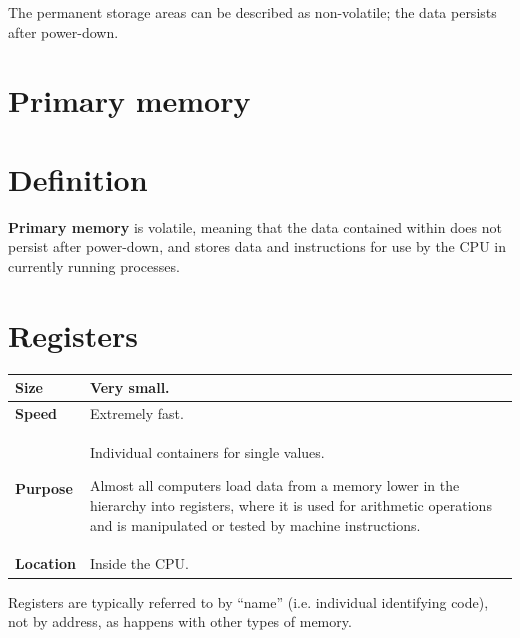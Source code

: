 \documentclass[a4paper]{systems-software}
\begin{document}
The permanent storage areas can be described as non-volatile; the data persists after power-down.


\newpage

\section{Primary memory}

\section*{Definition}

\textbf{Primary memory} is volatile, meaning that the data contained within does not persist after power-down, and stores data and instructions for use by the CPU in currently running processes.


\section*{Registers}

\begin{longtabu} to \textwidth {| X[1,l] | X[6,l] |}
    \hline
    \textbf{Size} & Very small.
	\\ \hline
	\textbf{Speed} & Extremely fast.
	\\ \hline
	\textbf{Purpose} & Individual containers for single values.
	
	Almost all computers load data from a memory lower in the hierarchy into registers, where it is used for arithmetic operations and is manipulated or tested by machine instructions.
	\\ \hline
	\textbf{Location} & Inside the CPU.
	\\ \hline
\end{longtabu}

Registers are typically referred to by “name” (i.e. individual identifying code), not by address, as happens with other types of memory.
\end{document}
